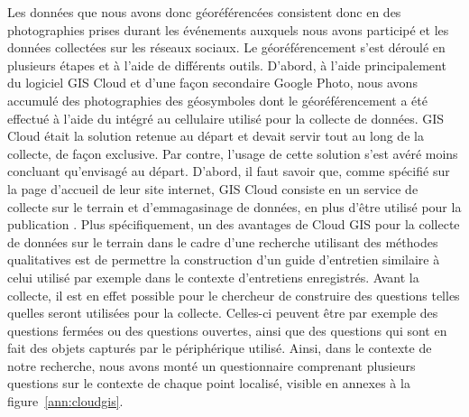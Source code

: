 Les données que nous avons donc géoréférencées consistent donc en des photographies prises durant les événements \lgbt{} auxquels nous avons participé et les données collectées sur les réseaux sociaux. 
Le géoréférencement s'est déroulé en plusieurs étapes et à l'aide de différents outils. 
D'abord, à l'aide principalement du logiciel GIS Cloud et d'une façon secondaire Google Photo, nous avons accumulé des photographies des géosymboles dont le géoréférencement a été effectué à l'aide du \gps{} intégré au cellulaire utilisé pour la collecte de données. 
GIS Cloud était la solution retenue au départ et devait servir tout au long de la collecte, de façon exclusive. 
Par contre, l'usage de cette solution s'est avéré moins concluant qu'envisagé au départ. 
D'abord, il faut savoir que, comme spécifié sur la page d'accueil de leur site internet, GIS Cloud consiste en un service de collecte sur le terrain et d’emmagasinage de données, en plus d'être utilisé pour la publication \citep{Cloud2014}. 
Plus spécifiquement, un des avantages de Cloud GIS pour la collecte de données sur le terrain dans le cadre d'une recherche utilisant des méthodes qualitatives est de permettre la construction d'un guide d'entretien similaire à celui utilisé par exemple dans le contexte d'entretiens enregistrés. 
Avant la collecte, il est en effet possible pour le chercheur de construire des questions telles quelles seront utilisées pour la collecte.
Celles-ci peuvent être par exemple des questions fermées ou des questions ouvertes, ainsi que des questions qui sont en fait des objets capturés par le périphérique utilisé. 
Ainsi, dans le contexte de notre recherche, nous avons monté un questionnaire comprenant plusieurs questions sur le contexte de chaque point localisé, visible en annexes à la figure~\ref{ann:cloudgis}.

